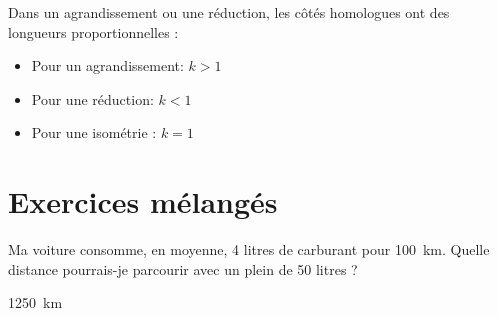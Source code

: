 \documentclass[../../syllabus_2.tex]{subfiles}
\begin{document}
Dans un agrandissement ou une réduction, les côtés homologues ont des longueurs proportionnelles :
\begin{itemize}[label=$\bullet$]
    \item Pour un agrandissement: \(k > 1\)
    \item Pour une réduction: \(k < 1\)
    \item Pour une isométrie : \(k = 1\)
\end{itemize}

%





\newpage
\section{Exercices mélangés}
\setcounter{exercise}{0}


\begin{exercise}
    Ma voiture consomme, en moyenne, 4 litres de carburant pour \SI{100}{km}. Quelle distance pourrais-je parcourir avec un plein de 50 litres ?
\end{exercise}
\begin{solution}
    \SI{1250}{km}
\end{solution}
\end{document}
